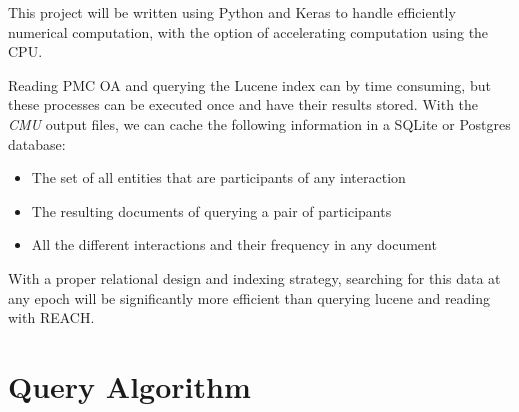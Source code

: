 \documentclass[12pt]{article}
\begin{document}
This project will be written using Python and Keras to handle efficiently numerical computation, with the option of accelerating computation using the CPU.

Reading PMC OA and querying the Lucene index can by time consuming, but these processes can be executed once and have their results stored. With the \emph{CMU} output files, we can cache the following information in a SQLite or Postgres database:

\begin{itemize}
  \item The set of all entities that are participants of any interaction
  \item The resulting documents of querying a pair of participants
  \item All the different interactions and their frequency in any document
\end{itemize}

With a proper relational design and indexing strategy, searching for this data at any epoch will be significantly more efficient than querying lucene and reading with REACH. 

\pagebreak
\appendix
\section{Query Algorithm}
\label{apx:query}
\end{document}
